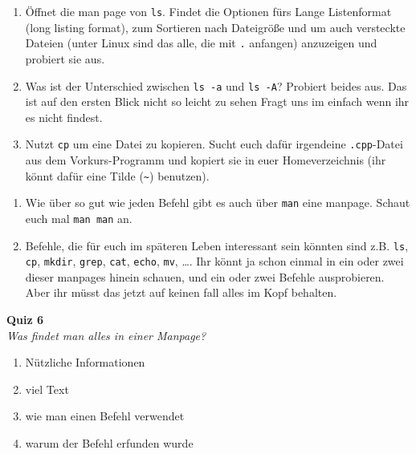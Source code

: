 \begin{praxis}
      \begin{enumerate}[resume]
      \item Öffnet die man page von \texttt{ls}. Findet die Optionen fürs Lange
                              Listenformat (long listing format), zum Sortieren nach Dateigröße
                              und um auch versteckte Dateien (unter Linux sind das alle, die mit
                              \texttt{.} anfangen) anzuzeigen und probiert sie aus.
      \item Was ist der Unterschied zwischen \texttt{ls -a} und \texttt{ls -A}?
            Probiert beides aus. Das ist auf den ersten Blick nicht so leicht zu sehen
                              Fragt uns im einfach wenn ihr es nicht findest.
      \item Nutzt \texttt{cp} um eine Datei zu kopieren. Sucht euch dafür
            irgendeine \texttt{.cpp}-Datei aus dem Vorkurs-Programm und kopiert sie
            in euer Homeverzeichnis (ihr könnt dafür eine Tilde (\texttt{\~})
            benutzen).
      \end{enumerate}
\end{praxis}

\begin{spiel}
    \begin{enumerate}
        \item Wie über so gut wie jeden Befehl gibt es auch über \texttt{man} eine
              manpage. Schaut euch mal \texttt{man man} an.
        \item Befehle, die für euch im späteren Leben interessant sein könnten sind
              z.B. \texttt{ls}, \texttt{cp}, \texttt{mkdir}, \texttt{grep}, \texttt{cat},
              \texttt{echo}, \texttt{mv}, \dots. Ihr könnt ja schon einmal in ein
              oder zwei dieser manpages hinein schauen, und ein oder zwei Befehle
              ausprobieren. Aber ihr müsst das jetzt auf keinen fall alles im Kopf
              behalten.
    \end{enumerate}
\end{spiel}

\textbf{Quiz 6}\\
\textit{Was findet man alles in einer Manpage?}
\begin{enumerate}[label=\alph]
    \item Nützliche Informationen
    \item viel Text
    \item wie man einen Befehl verwendet
    \item warum der Befehl erfunden wurde
\end{enumerate}
